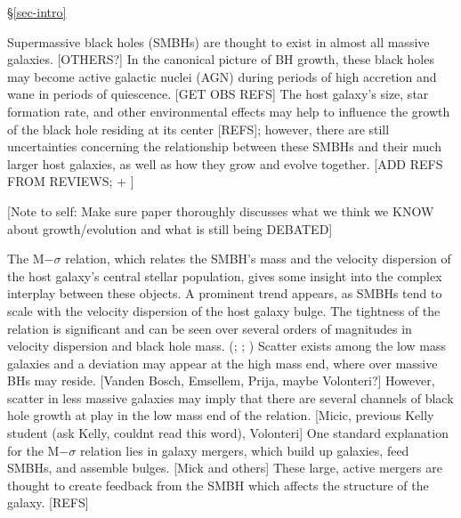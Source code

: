 \documentclass[manuscript]{aastex}
\begin{document}
\citep[for example; ][at the end of the line]{Bellovary2010,Tremmel2015,Fu2008}


 \S\ref{sec-intro}


Supermassive black holes (SMBHs) are thought to exist in almost all massive galaxies. \citep{Kormendy2013} [OTHERS?] In the canonical picture of BH growth, these black holes may become active galactic nuclei (AGN) during periods of high accretion and wane in periods of quiescence. \citep{Volonteri2012} [GET OBS REFS] The host galaxy's size, star formation rate, and other environmental effects may help to influence the growth of the black hole residing at its center [REFS]; however, there are still uncertainties concerning the relationship between these SMBHs and their much larger host galaxies, as well as how they grow and evolve together. [ADD REFS FROM REVIEWS; + \citep{Fu2008}]

[Note to self: Make sure paper thoroughly discusses what we think we KNOW about growth/evolution and what is still being DEBATED]

The M$-\sigma$ relation, which relates the SMBH's mass and the velocity dispersion of the host galaxy's central stellar population, gives some insight into the complex interplay between these objects. \citep{Kormendy2013} A prominent trend appears, as SMBHs tend to scale with the velocity dispersion of the host galaxy bulge. %
The tightness of the relation is significant and can be seen over several orders of magnitudes in velocity dispersion and black hole mass. (\cite{Mcconnell2013}; \cite{Kormendy2013}; \cite{Merritt2001}) Scatter exists among the low mass galaxies and a deviation may appear at the high mass end, where over massive BHs may reside. [Vanden Bosch, Emsellem, Prija, maybe Volonteri?] However, scatter in less massive galaxies may imply that there are several channels of black hole growth at play in the low mass end of the relation. [Micic, previous Kelly student (ask Kelly, couldnt read this word), Volonteri] One standard explanation for the M$-\sigma$ relation lies in galaxy mergers, which build up galaxies, feed SMBHs, and assemble bulges. [Mick and others] These large, active mergers are thought to create feedback from the SMBH which affects the structure of the galaxy. [REFS]
\end{document}
